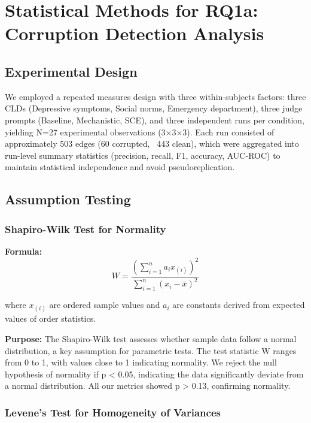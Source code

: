 \chapter{Statistical Methods for RQ1a: Corruption Detection Analysis}

\section{Experimental Design}

We employed a repeated measures design with three within-subjects factors: three CLDs (Depressive symptoms, Social norms, Emergency department), three judge prompts (Baseline, Mechanistic, SCE), and three independent runs per condition, yielding N=27 experimental observations (3×3×3). Each run consisted of approximately 503 edges (60 corrupted, ~443 clean), which were aggregated into run-level summary statistics (precision, recall, F1, accuracy, AUC-ROC) to maintain statistical independence and avoid pseudoreplication.

\section{Assumption Testing}

\subsection{Shapiro-Wilk Test for Normality}

\textbf{Formula:}
\begin{equation}
W = \frac{(\sum_{i=1}^{n} a_i x_{(i)})^2}{\sum_{i=1}^{n} (x_i - \bar{x})^2}
\end{equation}

where $x_{(i)}$ are ordered sample values and $a_i$ are constants derived from expected values of order statistics.

\textbf{Purpose:} The Shapiro-Wilk test assesses whether sample data follow a normal distribution, a key assumption for parametric tests. The test statistic W ranges from 0 to 1, with values close to 1 indicating normality. We reject the null hypothesis of normality if p < 0.05, indicating the data significantly deviate from a normal distribution. All our metrics showed p > 0.13, confirming normality.

\subsection{Levene's Test for Homogeneity of Variances}


